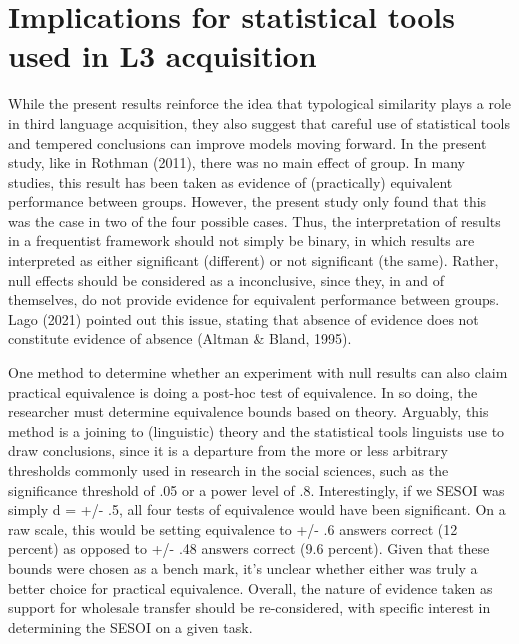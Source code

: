 \documentclass[
  man]{apa6}
\begin{document}
\hypertarget{implications-for-statistical-tools-used-in-l3-acquisition}{%
\section{Implications for statistical tools used in L3 acquisition}\label{implications-for-statistical-tools-used-in-l3-acquisition}}

While the present results reinforce the idea that typological similarity plays a role in third language acquisition, they also suggest that careful use of statistical tools and tempered conclusions can improve models moving forward.
In the present study, like in Rothman (2011), there was no main effect of group.
In many studies, this result has been taken as evidence of (practically) equivalent performance between groups.
However, the present study only found that this was the case in two of the four possible cases.
Thus, the interpretation of results in a frequentist framework should not simply be binary, in which results are interpreted as either significant (different) or not significant (the same).
Rather, null effects should be considered as a inconclusive, since they, in and of themselves, do not provide evidence for equivalent performance between groups.
Lago (2021) pointed out this issue, stating that absence of evidence does not constitute evidence of absence (Altman \& Bland, 1995).

One method to determine whether an experiment with null results can also claim practical equivalence is doing a post-hoc test of equivalence.
In so doing, the researcher must determine equivalence bounds based on theory.
Arguably, this method is a joining to (linguistic) theory and the statistical tools linguists use to draw conclusions, since it is a departure from the more or less arbitrary thresholds commonly used in research in the social sciences, such as the significance threshold of .05 or a power level of .8.
Interestingly, if we SESOI was simply d = +/- .5, all four tests of equivalence would have been significant.
On a raw scale, this would be setting equivalence to +/- .6 answers correct (12 percent) as opposed to +/- .48 answers correct (9.6 percent).
Given that these bounds were chosen as a bench mark, it's unclear whether either was truly a better choice for practical equivalence.
Overall, the nature of evidence taken as support for wholesale transfer should be re-considered, with specific interest in determining the SESOI on a given task.
\end{document}
